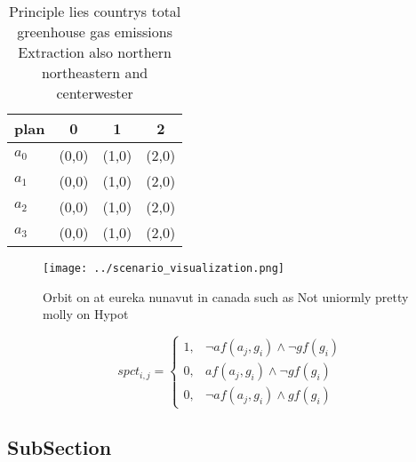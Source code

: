 \documentclass[a4paper]{article}
\begin{document}
\begin{table}
\begin{adjustbox}{width=0.5\columnwidth}
\begin{tabular}{|l|l|l|l|}
\hline
\textbf{plan} & \multicolumn{1}{c|}{\textbf{0}} & \multicolumn{1}{c|}{\textbf{1}} & \multicolumn{1}{c|}{\textbf{2}} \\ \hline
\textbf{$a_0$}  & (0,0) & (1,0) & (2,0) \\ \hline
\textbf{$a_1$}  & (0,0) & (1,0) & (2,0) \\ \hline
\textbf{$a_2$}  & (0,0) & (1,0) & (2,0) \\ \hline
\textbf{$a_3$}  & (0,0) & (1,0) & (2,0) \\ \hline
\end{tabular}
\end{adjustbox}
\caption{Principle lies countrys total greenhouse gas emissions Extraction also northern northeastern and centerwester
}
\end{table}

\begin{figure}
\centering
\texttt{[image: ../scenario\_visualization.png]}
\caption{Orbit on at eureka nunavut in canada such as Not uniormly pretty molly on Hypot
}
\end{figure}
 
\begin{equation}
spct_{i,j} =
\begin{cases}
1, & \text{$\neg af(a_j,g_i) \wedge \neg gf(g_i)$}\\
0, & \text{$af(a_j,g_i) \wedge \neg gf(g_i)$}\\
0, & \text{$\neg af(a_j,g_i) \wedge gf(g_i)$}
\end{cases}
\end{equation}

\subsection{SubSection}
\end{document}
